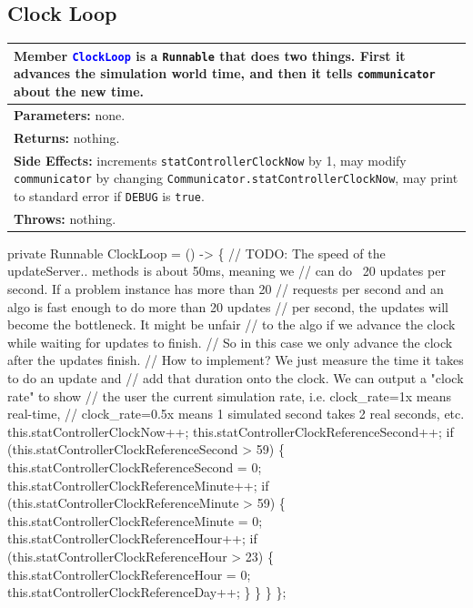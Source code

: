 \subsection{Clock Loop}
\begin{tabular}{p{\textwidth}}
\toprule
\rowcolor{TableTitle}
Member \textcolor{blue}{{\tt{}ClockLoop}} is a {\tt{}Runnable} that does two things.
First it advances the simulation world time, and then it tells {\tt{}communicator}
about the new time.\\
\midrule
\textbf{Parameters:} none.\\
\textbf{Returns:} nothing.\\
\textbf{Side Effects:} increments {\tt{}statControllerClockNow} by 1, may modify
{\tt{}communicator} by changing {\tt{}Communicator.statControllerClockNow}, may print to
standard error if {\tt{}DEBUG} is {\tt{}true}.\\
\textbf{Throws:} nothing.\\
\bottomrule
\end{tabular}
\nwenddocs{}\endmoddef{}
private Runnable ClockLoop = () -> \{
  // TODO: The speed of the updateServer.. methods is about 50ms, meaning we
  // can do ~20 updates per second. If a problem instance has more than 20
  // requests per second and an algo is fast enough to do more than 20 updates
  // per second, the updates will become the bottleneck. It might be unfair
  // to the algo if we advance the clock while waiting for updates to finish.
  // So in this case we only advance the clock after the updates finish.
  // How to implement? We just measure the time it takes to do an update and
  // add that duration onto the clock. We can output a "clock rate" to show
  // the user the current simulation rate, i.e. clock_rate=1x means real-time,
  // clock_rate=0.5x means 1 simulated second takes 2 real seconds, etc.
  this.statControllerClockNow++;
  this.statControllerClockReferenceSecond++;
  if (this.statControllerClockReferenceSecond > 59) \{
    this.statControllerClockReferenceSecond = 0;
    this.statControllerClockReferenceMinute++;
    if (this.statControllerClockReferenceMinute > 59) \{
      this.statControllerClockReferenceMinute = 0;
      this.statControllerClockReferenceHour++;
      if (this.statControllerClockReferenceHour > 23) \{
        this.statControllerClockReferenceHour = 0;
        this.statControllerClockReferenceDay++;
      \}
    \}
  \}
\};
\nwendcode{}\nwdocspar


